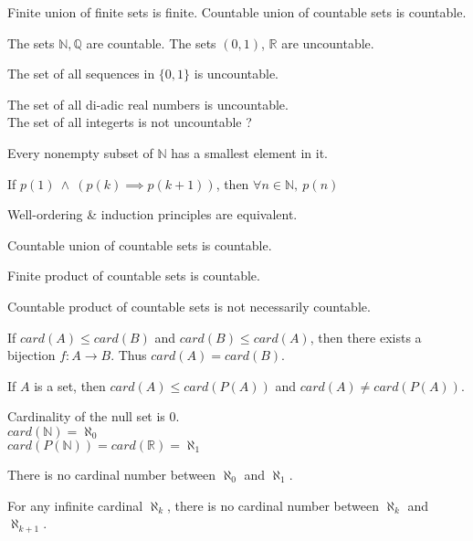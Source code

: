 	\begin{theorem}
		Finite union of finite sets is finite. Countable union of countable sets is countable.
	\end{theorem}
	\begin{remark}
		The sets $\mathbb{N},\mathbb{Q}$ are countable.
		The sets $(0,1)$, $\mathbb{R}$ are uncountable.
	\end{remark}
	\begin{theorem}
		The set of all sequences in $\{0,1\}$ is uncountable.
	\end{theorem}
	\begin{remark}
		The set of all di-adic real numbers is uncountable.\\
		The set of all integerts is not uncountable ?
	\end{remark}
	\begin{theorem}
		Every nonempty subset of $\mathbb{N}$ has a smallest element in it.
	\end{theorem}
	\begin{theorem}[induction]
		If $p(1)\ \wedge \ (p(k) \implies p(k+1))$, then $\forall n \in \mathbb{N},\ p(n)$
	\end{theorem}
	\begin{remark}
		Well-ordering \& induction principles are equivalent.
	\end{remark}
	\begin{theorem}
		Countable union of countable sets is countable.
	\end{theorem}
	\begin{theorem}
		Finite product of countable sets is countable.
	\end{theorem}
	\begin{remark}
		Countable product of countable sets is not necessarily countable.
	\end{remark}
	\begin{remark}
		If $card(A) \le card(B)$ and $card(B) \le card(A)$, then there exists a bijection $f:A \to B$. Thus $card(A) = card(B)$.
	\end{remark}
	\begin{theorem}[Cantor]
		If $A$ is a set, then $card(A) \le  card(P(A))$ and $card(A) \ne card(P(A))$.
	\end{theorem}
	\begin{remark}
		Cardinality of the null set is 0.\\
		$card(\mathbb{N}) = \aleph_0$\\
		$card(P(\mathbb{N})) = card(\mathbb{R}) = \aleph_1$
	\end{remark}
	\begin{remark}
		There is no cardinal number between $\aleph_0$ and $\aleph_1$.
	\end{remark}
	\begin{remark}
		For any infinite cardinal $\aleph_k$, there is no cardinal number between $\aleph_k$ and $\aleph_{k+1}$.
	\end{remark}

